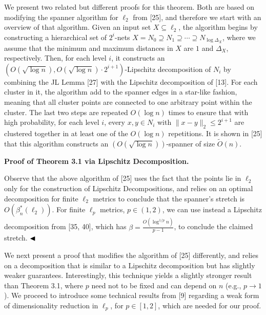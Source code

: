 \documentclass[10pt,a4paper]{amsart}
\begin{document}
We present two related but different proofs for this theorem. Both are based on modifying the spanner algorithm for $\ell_{2}$ from [25], and therefore we start with an overview of that algorithm. Given an input set $X\subseteq\ell_{2}$, the algorithm begins by constructing a hierarchical set of $2^{i}$-nets $X=N_{0}\supseteq N_{1}\supseteq\cdots\supseteq N_{\log{\Delta_{X}}}$, where we assume that the minimum and maximum distances in $X$ are $1$ and $\Delta_{X}$, respectively. Then, for each level $i$, it constructs an $(O(\sqrt{\log n}),O(\sqrt{\log n})\cdot 2^{i+1})$-Lipschitz decomposition of $N_{i}$ by combining the JL Lemma [27] with the Lipschitz decomposition of [13]. For each cluster in it, the algorithm add to the spanner edges in a star-like fashion, meaning that all cluster points are connected to one arbitrary point within the cluster. The last two steps are repeated $O(\log n)$ times to ensure that with high probability, for each level $i$, every $x,y\in N_{i}$ with $\|x-y\|_{2}\leq 2^{i+1}$ are clustered together in at least one of the $O(\log n)$ repetitions. It is shown in [25] that this algorithm constructs an $(O(\sqrt{\log{n}}))$-spanner of size $\tilde{O}(n)$.
\par
\par
\par\medskip\noindent\textbf{Proof of Theorem 3.1 via Lipschitz Decomposition.}\par
Observe that the above algorithm of [25] uses the fact that the points lie in $\ell_{2}$ only for the construction of Lipschitz Decompositions, and relies on an optimal decomposition for finite $\ell_{2}$ metrics to conclude that the spanner’s stretch is $O(\beta^{*}_{n}(\ell_{2}))$. For finite $\ell_{p}$ metrics, $p\in(1,2)$, we can use instead a Lipschitz decomposition from [35, 40], which has $\beta=\frac{O(\log^{1/p}{n})}{p-1}$, to conclude the claimed stretch. $\hfill\blacktriangleleft$
\par
\par
We next present a proof that modifies the algorithm of [25] differently, and relies on a decomposition that is similar to a Lipschitz decomposition but has slightly weaker guarantees. Interestingly, this technique yields a slightly stronger result than Theorem 3.1, where $p$ need not to be fixed and can depend on $n$ (e.g., $p\to 1$). We proceed to introduce some technical results from [9] regarding a weak form of dimensionality reduction in $\ell_{p}$, for $p\in[1,2]$, which are needed for our proof.
\par
\par
\end{document}
